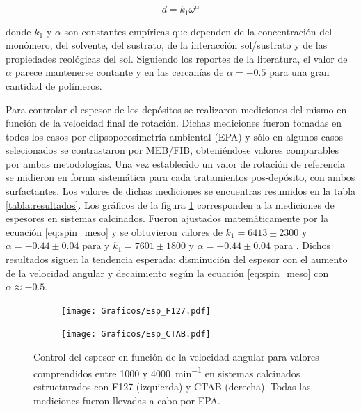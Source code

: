 			\begin{equation}
			  d = k_1 \omega^{\alpha}
			  \label{eq:spin_meso}
			  \end{equation}		
	
		\noindent donde $k_1$ y $\alpha$ son constantes empíricas que dependen de la concentración del monómero, del solvente, del sustrato, de la interacción sol/sustrato y  de las propiedades reológicas del sol. Siguiendo los reportes de la literatura, el valor de $\alpha$ parece mantenerse contante y en las cercanías de $\alpha=-0.5$ para una gran cantidad de polímeros.\cite{Meyerhofer1978,Bornside1989,Lora1990}

		Para controlar el espesor de los depósitos se realizaron mediciones del mismo en función de la velocidad final de rotación.  Dichas mediciones fueron tomadas en todos los casos por elipsoporosimetría ambiental (EPA) y sólo en algunos casos selecionados se contrastaron por MEB/FIB, obteniéndose valores comparables por ambas metodologías. Una vez establecido un valor de rotación de referencia se midieron en forma sistemática para cada tratamientos pos-depósito, con ambos surfactantes. Los valores de dichas mediciones se encuentras resumidos en la tabla \ref{tabla:resultados}.
		Los gráficos de la figura \ref{fig:esp} corresponden a la mediciones de espesores en sistemas calcinados. Fueron ajustados matemáticamente por la ecuación \ref{eq:spin_meso} y se obtuvieron valores de $k_1=6413\pm 2300$ y $\alpha=-0.44 \pm 0.04$ para \pdmF\space y $k_1=7601\pm 1800$ y $\alpha=-0.44 \pm 0.04$ para \pdmC. Dichos resultados siguen la tendencia esperada: disminución del espesor con el aumento de la velocidad angular y decaimiento según la ecuación \ref{eq:spin_meso} con $\alpha \approx -0.5$. 

		
			\begin{figure}[!ht]
				\begin{subfigure}[t]{0.495\textwidth}
				\texttt{[image: Graficos/Esp\_F127.pdf]}
				\end{subfigure}
				\begin{subfigure}[t]{0.495\textwidth}
				\texttt{[image: Graficos/Esp\_CTAB.pdf]}
				\end{subfigure}
				\caption[Espesor en función de la velocidad angular]{Control del espesor en función de la velocidad angular para valores comprendidos entre 1000 y \SI{4000}{\minute^{-1}} en sistemas calcinados estructurados con F127 (izquierda) y CTAB (derecha). Todas las mediciones fueron llevadas a cabo por EPA.}
				\label{fig:esp}		
				\end{figure}
	
